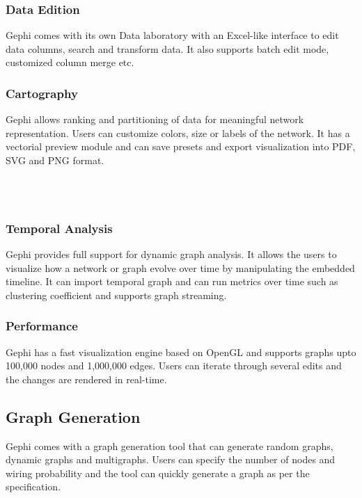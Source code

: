 \documentclass[11pt,a4paper,oneside]{article}
\begin{document}
	\subsubsection{Data Edition}
	Gephi comes with its own Data laboratory with an Excel-like interface to edit data columns, search and transform data. It also supports batch edit mode, customized column merge etc.
	
	\subsubsection{Cartography}
	Gephi allows ranking and partitioning of data for meaningful network representation. Users can customize colors, size or labels of the network. It has a vectorial preview module and can save presets and export visualization into PDF, SVG and PNG format. \\
	\newline
	
	\begin{verbatim}
		
	
	\end{verbatim}
	
	\subsubsection{Temporal Analysis}
	Gephi provides full support for dynamic graph analysis. It allows the users to visualize how a network or graph evolve over time by manipulating the embedded timeline. It can import temporal graph and can run metrics over time such as clustering coefficient and supports graph streaming.
	
	\subsubsection{Performance}
	Gephi has a fast visualization engine based on OpenGL and supports graphs upto 100,000 nodes and 1,000,000 edges. Users can iterate through several edits and the changes are rendered in real-time. 
	
	\subsection{Graph Generation}
	Gephi comes with a graph generation tool that can generate random graphs, dynamic graphs and multigraphs. Users can specify the number of nodes and wiring probability and the tool can quickly generate a graph as per the specification.
	
\end{document}
